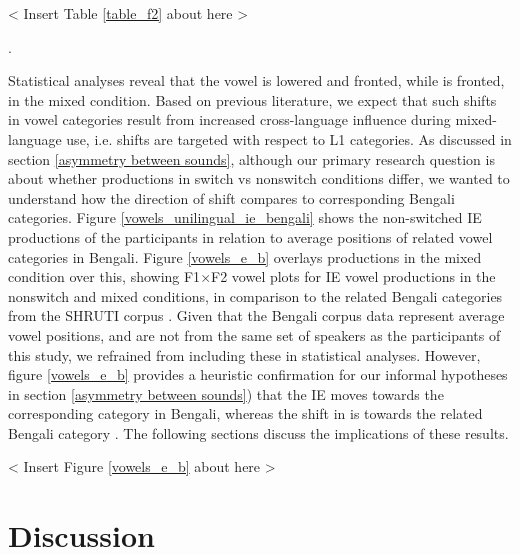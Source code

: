 \documentclass[12 pt]{article}
\newcommand{\nt}[1]{\textipa{[#1]}} %
\begin{document}
< Insert Table \ref{table_f2} about here >

.

Statistical analyses reveal that the vowel \nt{2} is lowered and fronted, while \nt{\ae} is fronted, in the mixed condition. Based on previous literature, we expect that such shifts in vowel categories result from increased cross-language influence during mixed-language use, i.e. shifts are targeted with respect to L1 categories. As discussed in section \ref{asymmetry between sounds}, although our primary research question is about whether productions in switch vs nonswitch conditions differ, we wanted to understand how the direction of shift compares to corresponding Bengali categories. Figure \ref{vowels_unilingual_ie_bengali} shows the non-switched IE productions of the participants in relation to average positions of related vowel categories in Bengali. Figure \ref{vowels_e_b} overlays productions in the mixed condition over this, showing F1$\times$F2 vowel plots for IE vowel productions in the nonswitch and mixed conditions, in comparison to the related Bengali categories from the SHRUTI corpus \cite{shruticorpus}. Given that the Bengali corpus data represent average vowel positions, and are not from the same set of speakers as the participants of this study, we refrained from including these in statistical analyses. However, figure \ref{vowels_e_b} provides a heuristic confirmation for our informal hypotheses in section \ref{asymmetry between sounds}) that the IE \nt{\ae} moves towards the corresponding \nt{\ae} category in Bengali, whereas the shift in \nt{2} is towards the related Bengali category \nt{a:}. The following sections discuss the implications of these results.

< Insert Figure \ref{vowels_e_b} about here >

\section{Discussion}
\end{document}
